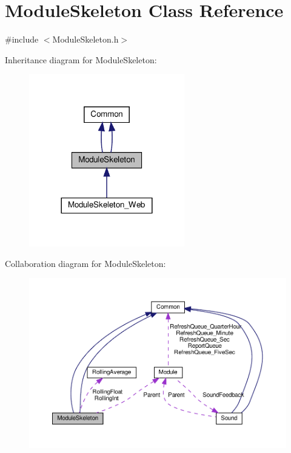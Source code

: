 \hypertarget{class_module_skeleton}{}\section{Module\+Skeleton Class Reference}
\label{class_module_skeleton}


{\ttfamily \#include $<$Module\+Skeleton.\+h$>$}



Inheritance diagram for Module\+Skeleton\+:
\nopagebreak
\begin{figure}[H]
\begin{center}
\leavevmode
\includegraphics[width=192pt]{class_module_skeleton__inherit__graph}
\end{center}
\end{figure}


Collaboration diagram for Module\+Skeleton\+:
\nopagebreak
\begin{figure}[H]
\begin{center}
\leavevmode
\includegraphics[width=350pt]{class_module_skeleton__coll__graph}
\end{center}
\end{figure}

